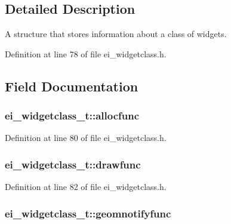 \subsection{Detailed Description}
A structure that stores information about a class of widgets. 

Definition at line 78 of file ei\-\_\-widgetclass.\-h.



\subsection{Field Documentation}
\hypertarget{structei__widgetclass__t_a233446250cdde4347c1381427923d21a}{
\subsubsection[{allocfunc}]{ ei\-\_\-widgetclass\-\_\-t\-::allocfunc}}\label{structei__widgetclass__t_a233446250cdde4347c1381427923d21a}


Definition at line 80 of file ei\-\_\-widgetclass.\-h.

\hypertarget{structei__widgetclass__t_a528168099a2a1515c4cf65400ccbfff2}{
\subsubsection[{drawfunc}]{ ei\-\_\-widgetclass\-\_\-t\-::drawfunc}}\label{structei__widgetclass__t_a528168099a2a1515c4cf65400ccbfff2}


Definition at line 82 of file ei\-\_\-widgetclass.\-h.

\hypertarget{structei__widgetclass__t_aaf0aa3f54a48a6b3f8b8e12574ede4b7}{
\subsubsection[{geomnotifyfunc}]{ ei\-\_\-widgetclass\-\_\-t\-::geomnotifyfunc}}\label{structei__widgetclass__t_aaf0aa3f54a48a6b3f8b8e12574ede4b7}


